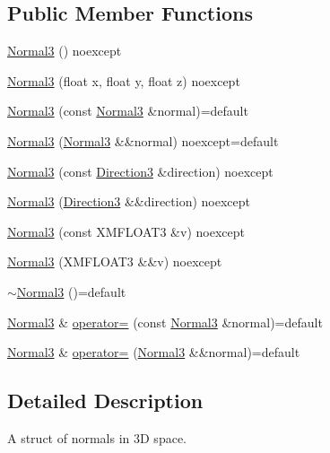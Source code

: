 \subsection*{Public Member Functions}
\begin{DoxyCompactItemize}
\item 
\hyperlink{structmage_1_1_normal3_a64a99fa013aff357da71a39f1957e7c6}{Normal3} () noexcept
\item 
\hyperlink{structmage_1_1_normal3_a3af172346d687b0a7e5444698e10a299}{Normal3} (float x, float y, float z) noexcept
\item 
\hyperlink{structmage_1_1_normal3_a666eb2b91f6c00123bba1b751fd71708}{Normal3} (const \hyperlink{structmage_1_1_normal3}{Normal3} \&normal)=default
\item 
\hyperlink{structmage_1_1_normal3_ab29b3dcf7fc05c459f2e9b91b6832115}{Normal3} (\hyperlink{structmage_1_1_normal3}{Normal3} \&\&normal) noexcept=default
\item 
\hyperlink{structmage_1_1_normal3_a477777d95f0ad41e6087668c965dd9b2}{Normal3} (const \hyperlink{structmage_1_1_direction3}{Direction3} \&direction) noexcept
\item 
\hyperlink{structmage_1_1_normal3_a55d265ba8454dd5d4573ad9d09844cee}{Normal3} (\hyperlink{structmage_1_1_direction3}{Direction3} \&\&direction) noexcept
\item 
\hyperlink{structmage_1_1_normal3_ad812f4b279f8ef1a28f71925c90efcf8}{Normal3} (const X\+M\+F\+L\+O\+A\+T3 \&v) noexcept
\item 
\hyperlink{structmage_1_1_normal3_ac6a5bc0d574ab2a85dba8e5cb8539d58}{Normal3} (X\+M\+F\+L\+O\+A\+T3 \&\&v) noexcept
\item 
\hyperlink{structmage_1_1_normal3_a3384b2970fd85fe729514ce0686b4446}{$\sim$\+Normal3} ()=default
\item 
\hyperlink{structmage_1_1_normal3}{Normal3} \& \hyperlink{structmage_1_1_normal3_ad446f029ba58615f98b4da13e7e4c5ba}{operator=} (const \hyperlink{structmage_1_1_normal3}{Normal3} \&normal)=default
\item 
\hyperlink{structmage_1_1_normal3}{Normal3} \& \hyperlink{structmage_1_1_normal3_ab8fd629ae1e399b468a229fc4ea58222}{operator=} (\hyperlink{structmage_1_1_normal3}{Normal3} \&\&normal)=default
\end{DoxyCompactItemize}


\subsection{Detailed Description}
A struct of normals in 3D space.

